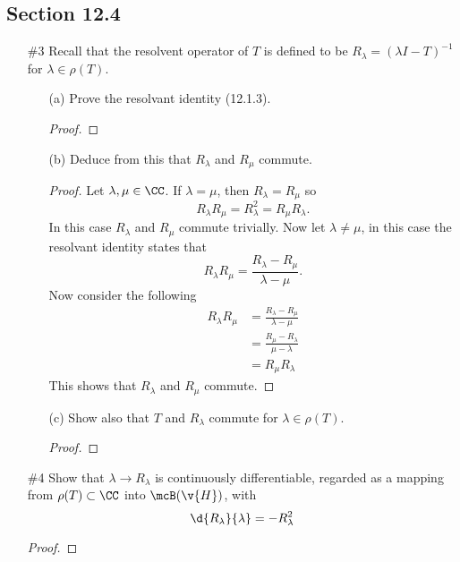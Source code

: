 \documentclass[11pt, oneside]{article}
\begin{document}
\subsection*{Section 12.4}
\begin{enumerate}
  \item[\#3]
    Recall that the resolvent operator of $T$ is defined to be
    $R_{\lambda} = (\lambda I - T)^{-1}$ for $\lambda \in \rho(T)$.
    \begin{enumerate}
      \item[(a)]
        Prove the resolvant identity (12.1.3).

        \begin{proof}
          
        \end{proof}

      \item[(b)] %
        Deduce from this that $R_{\lambda}$ and $R_{\mu}$ commute.

        \begin{proof}
          Let $\lambda, \mu \in \CC$.
          If $\lambda = \mu$, then $R_{\lambda} = R_{\mu}$ so
          \[
            R_{\lambda} R_{\mu} = R_{\lambda}^2 = R_{\mu} R_{\lambda}.
          \]
          In this case $R_{\lambda}$ and $R_{\mu}$ commute trivially.
          Now let $\lambda \neq \mu$, in this case the resolvant identity
          states that
          \[
            R_{\lambda} R_{\mu} = \frac{R_{\lambda} - R_{\mu}}{\lambda - \mu}.
          \]
          Now consider the following
          \begin{align*}
            R_{\lambda} R_{\mu} &= \frac{R_{\lambda} - R_{\mu}}{\lambda - \mu} \\
            &= \frac{R_{\mu} - R_{\lambda}}{\mu - \lambda} \\
            &= R_{\mu} R_{\lambda}
          \end{align*}
          This shows that $R_{\lambda}$ and $R_{\mu}$ commute.
        \end{proof}

      \item[(c)]
        Show also that $T$ and $R_{\lambda}$ commute for $\lambda \in \rho(T)$.

        \begin{proof}
          
        \end{proof}
    \end{enumerate}

  \pagebreak
  \item[\#4]
    Show that $\lambda \to R_{\lambda}$ is continuously differentiable, regarded
    as a mapping from $\rho(T) \subset \CC$ into $\mcB(\v{H})$, with
    \[
      \d{R_{\lambda}}{\lambda} = -R_{\lambda}^2
    \]

    \begin{proof}
      
    \end{proof}
\end{enumerate}
\end{document}

